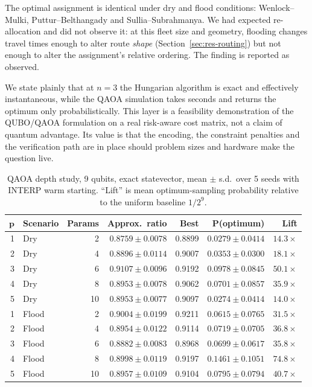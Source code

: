 \documentclass[10pt,twocolumn]{article}
\begin{document}
The optimal assignment is identical under dry and flood conditions:
Wenlock--Mulki, Puttur--Belthangady and Sullia--Subrahmanya. We had expected
re-allocation and did not observe it: at this fleet size and geometry,
flooding changes travel times enough to alter route \emph{shape}
(Section~\ref{sec:res-routing}) but not enough to alter the assignment's relative
ordering. The finding is reported as observed.

We state plainly that at $n=3$ the Hungarian algorithm is exact and effectively
instantaneous, while the QAOA simulation takes seconds and returns the optimum
only probabilistically. This layer is a feasibility demonstration of the
QUBO/QAOA formulation on a real risk-aware cost matrix, not a claim of quantum
advantage. Its value is that the encoding, the constraint penalties and the
verification path are in place should problem sizes and hardware make the
question live.

\begin{table}[!t]
\centering\footnotesize
\caption{QAOA depth study, 9 qubits, exact statevector, mean $\pm$ s.d.\ over
5 seeds with INTERP warm starting. ``Lift'' is mean optimum-sampling probability
relative to the uniform baseline $1/2^9$.}
\label{tab:qaoa}
\small
\begin{tabular}{@{}rlrrrrr@{}}
\toprule
$\boldsymbol{p}$ & \textbf{Scenario} & \textbf{Params} &
\textbf{Approx.\ ratio} & \textbf{Best} & \textbf{P(optimum)} & \textbf{Lift} \\
\midrule
1 & Dry & 2 & $0.8759\pm0.0078$ & 0.8899 & $0.0279\pm0.0414$ & $14.3\times$ \\
2 & Dry & 4 & $0.8896\pm0.0114$ & 0.9007 & $0.0353\pm0.0300$ & $18.1\times$ \\
3 & Dry & 6 & $0.9107\pm0.0096$ & 0.9192 & $0.0978\pm0.0845$ & $50.1\times$ \\
4 & Dry & 8 & $0.8953\pm0.0078$ & 0.9062 & $0.0701\pm0.0857$ & $35.9\times$ \\
5 & Dry & 10 & $0.8953\pm0.0077$ & 0.9097 & $0.0274\pm0.0414$ & $14.0\times$ \\
\midrule
1 & Flood & 2 & $0.9004\pm0.0199$ & 0.9211 & $0.0615\pm0.0765$ & $31.5\times$ \\
2 & Flood & 4 & $0.8954\pm0.0122$ & 0.9114 & $0.0719\pm0.0705$ & $36.8\times$ \\
3 & Flood & 6 & $0.8882\pm0.0083$ & 0.8968 & $0.0699\pm0.0617$ & $35.8\times$ \\
4 & Flood & 8 & $0.8998\pm0.0119$ & 0.9197 & $0.1461\pm0.1051$ & $74.8\times$ \\
5 & Flood & 10 & $0.8957\pm0.0109$ & 0.9104 & $0.0795\pm0.0794$ & $40.7\times$ \\
\bottomrule
\end{tabular}
\end{table}
\end{document}
